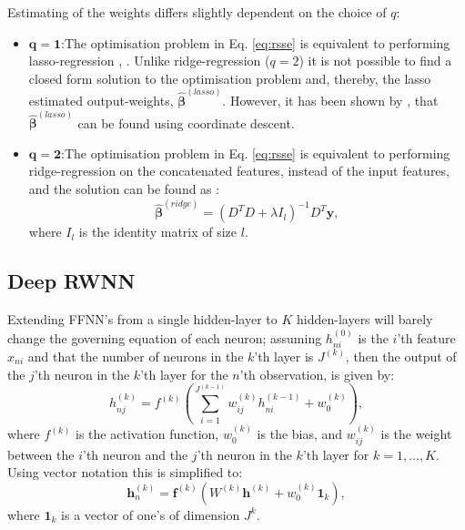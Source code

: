 \documentclass[
]{jss}
\begin{document}
Estimating of the weights differs slightly dependent on the choice of
\(q\):

\begin{itemize}
\item
  \underline{$\boldsymbol{q = 1}$}:\newline  The optimisation problem in
  Eq. \eqref{eq:rsse} is equivalent to performing lasso-regression
  \citep{SanLasso}, \citep{TibLasso}. Unlike ridge-regression
  (\(q = 2\)) it is not possible to find a closed form solution to the
  optimisation problem and, thereby, the lasso estimated output-weights,
  \(\hat{\boldsymbol{\beta}}^{(lasso)}\). However, it has been shown by
  \citep{CoordLasso}, that \(\hat{\boldsymbol{\beta}}^{(lasso)}\) can be
  found using coordinate descent.
\item
  \underline{$\boldsymbol{q = 2}$}:\newline  The optimisation problem in
  Eq. \eqref{eq:rsse} is equivalent to performing ridge-regression on
  the concatenated features, instead of the input features, and the
  solution can be found as \citep{ridgeReg}: \begin{equation}
  \hat{\boldsymbol \beta}^{(ridge)} = \left(D^TD + \lambda I_{l}\right)^{-1}D^T\boldsymbol y,
  \end{equation} where \(I_{l}\) is the identity matrix of size \(l\).
\end{itemize}

\hypertarget{deepRWNN}{%
\subsection{Deep RWNN}\label{deepRWNN}}

Extending FFNN's from a single hidden-layer to \(K\) hidden-layers will
barely change the governing equation of each neuron; assuming
\(h_{ni}^{(0)}\) is the \(i\)'th feature \(x_{ni}\) and that the number
of neurons in the \(k\)'th layer is \(J^{(k)}\), then the output of the
\(j\)'th neuron in the \(k\)'th layer for the \(n\)'th observation, is
given by: \begin{equation}
    h_{nj}^{(k)} = f^{(k)}\left(\sum_{i = 1}^{J^{(k - 1)}} w^{(k)}_{ij} h_{ni}^{(k - 1)} + w^{(k)}_{0}\right), \label{eq:hidden2} 
\end{equation} where \(f^{(k)}\) is the activation function,
\(w^{(k)}_0\) is the bias, and \(w^{(k)}_{ij}\) is the weight between
the \(i\)'th neuron and the \(j\)'th neuron in the \(k\)'th layer for
\(k = 1, ..., K\). Using vector notation this is simplified to:
\begin{equation}
    \boldsymbol h_n^{(k)} = \boldsymbol f^{(k)}\left(W^{(k)} \boldsymbol{h}^{(k)} + w^{(k)}_0 \boldsymbol{1}_{k}\right),
\end{equation} where \(\boldsymbol{1}_k\) is a vector of one's of
dimension \(J^{k}\).
\end{document}
